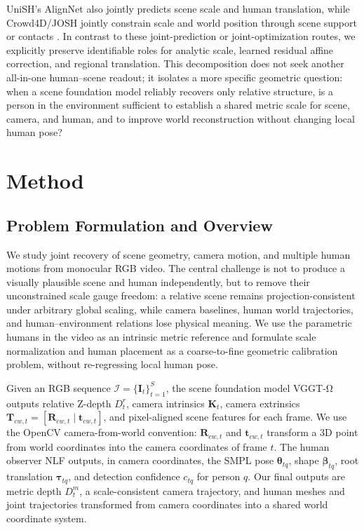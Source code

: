 \documentclass{article}
\begin{document}
UniSH's AlignNet also jointly predicts scene scale and human translation, while Crowd4D/JOSH jointly constrain scale and world position through scene support or contacts \citep{li2026unish,kang2026crowd4d,liu2026josh}. In contrast to these joint-prediction or joint-optimization routes, we explicitly preserve identifiable roles for analytic scale, learned residual affine correction, and regional translation. This decomposition does not seek another all-in-one human--scene readout; it isolates a more specific geometric question: when a scene foundation model reliably recovers only relative structure, is a person in the environment sufficient to establish a shared metric scale for scene, camera, and human, and to improve world reconstruction without changing local human pose?

\section{Method}\label{sec:method}

\subsection{Problem Formulation and Overview}

We study joint recovery of scene geometry, camera motion, and multiple human motions from monocular RGB video. The central challenge is not to produce a visually plausible scene and human independently, but to remove their unconstrained scale gauge freedom: a relative scene remains projection-consistent under arbitrary global scaling, while camera baselines, human world trajectories, and human--environment relations lose physical meaning. We use the parametric humans in the video as an intrinsic metric reference and formulate scale normalization and human placement as a coarse-to-fine geometric calibration problem, without re-regressing local human pose.

Given an RGB sequence $\mathcal{I}=\{\mathbf{I}_t\}_{t=1}^{S}$, the scene foundation model VGGT-Ω outputs relative Z-depth $D_t^r$, camera intrinsics $\mathbf{K}_t$, camera extrinsics $\mathbf{T}_{cw,t}=[\mathbf{R}_{cw,t}\mid\mathbf{t}_{cw,t}]$, and pixel-aligned scene features for each frame. We use the OpenCV camera-from-world convention: $\mathbf{R}_{cw,t}$ and $\mathbf{t}_{cw,t}$ transform a 3D point from world coordinates into the camera coordinates of frame $t$. The human observer NLF outputs, in camera coordinates, the SMPL pose $\boldsymbol{\theta}_{tq}$, shape $\boldsymbol{\beta}_{tq}$, root translation $\boldsymbol{\tau}_{tq}$, and detection confidence $c_{tq}$ for person $q$. Our final outputs are metric depth $D_t^m$, a scale-consistent camera trajectory, and human meshes and joint trajectories transformed from camera coordinates into a shared world coordinate system.
\end{document}
